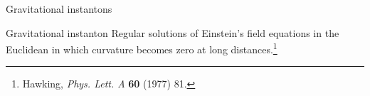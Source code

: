 \documentclass[aspectratio=169,xcolor=dvipsnames]{beamer}
\begin{document}


\begin{frame}{Gravitational instantons}\justifying
{}
\begin{block}{Gravitational instanton}\justifying
    Regular solutions of Einstein's field equations in the Euclidean in which curvature becomes zero at long distances.\footnote{Hawking, \textit{Phys. Lett. A} \textbf{60} (1977) 81.}
\end{block}
\end{frame}
\end{document}
